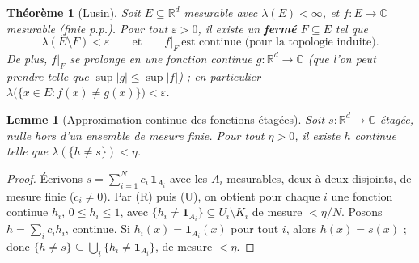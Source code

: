 \documentclass[11pt,a4paper]{article}
\theoremstyle{plain}
\newtheorem{theoreme}{Théorème}
\newtheorem{lemme}{Lemme}
\theoremstyle{definition}
\newcommand{\R}{\mathbb{R}}
\newcommand{\1}{\mathbf{1}}
\newcommand{\ind}[1]{\1_{#1}}
\newcommand{\abs}[1]{\left|#1\right|}
\begin{document}
\begin{theoreme}[Lusin]\label{th:lusin}
Soit $E\subseteq\R^d$ mesurable avec $\lambda(E)<\infty$, et $f:E\to\mathbb C$
mesurable (finie p.p.). Pour tout $\varepsilon>0$, il existe un \textbf{fermé}
$F\subseteq E$ tel que
\[
  \lambda(E\setminus F)<\varepsilon
  \qquad\text{et}\qquad
  f|_F\ \text{est continue (pour la topologie induite).}
\]
De plus, $f|_F$ se prolonge en une fonction continue $g:\R^d\to\mathbb C$ (que l'on
peut prendre telle que $\sup\abs{g}\le\sup\abs{f}$) ; en particulier
$\lambda\bigl(\{x\in E: f(x)\ne g(x)\}\bigr)<\varepsilon$.
\end{theoreme}

\begin{lemme}[Approximation continue des fonctions étagées]\label{lem:etagee}
Soit $s:\R^d\to\mathbb C$ étagée, nulle hors d'un ensemble de mesure finie. Pour
tout $\eta>0$, il existe $h$ continue telle que $\lambda(\{h\ne s\})<\eta$.
\end{lemme}

\begin{proof}
Écrivons $s=\sum_{i=1}^{N}c_i\,\ind{A_i}$ avec les $A_i$ mesurables, deux à deux
disjoints, de mesure finie ($c_i\ne0$). Par (R) puis (U), on obtient pour chaque
$i$ une fonction continue $h_i$, $0\le h_i\le1$, avec
$\{h_i\ne\ind{A_i}\}\subseteq U_i\setminus K_i$ de mesure $<\eta/N$. Posons
$h=\sum_i c_i h_i$, continue. Si $h_i(x)=\ind{A_i}(x)$ pour tout $i$, alors
$h(x)=s(x)$ ; donc $\{h\ne s\}\subseteq\bigcup_i\{h_i\ne\ind{A_i}\}$, de mesure
$<\eta$.
\end{proof}
\end{document}
